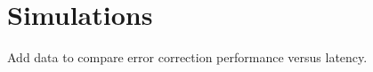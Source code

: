 \chapter{Simulations} \label{chap:Simulation}

Add data to compare error correction performance versus latency.